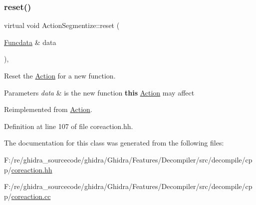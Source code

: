 \subsubsection{\texorpdfstring{reset()}{reset()}}
{\footnotesize\ttfamily virtual void Action\+Segmentize\+::reset (\begin{DoxyParamCaption}\item[{\mbox{\hyperlink{class_funcdata}{Funcdata}} \&}]{data }\end{DoxyParamCaption})\hspace{0.3cm}{\ttfamily [inline]}, {\ttfamily [virtual]}}



Reset the \mbox{\hyperlink{class_action}{Action}} for a new function. 


\begin{DoxyParams}{Parameters}
{\em data} & is the new function {\bfseries{this}} \mbox{\hyperlink{class_action}{Action}} may affect \\
\hline
\end{DoxyParams}


Reimplemented from \mbox{\hyperlink{class_action_ac7c1cf16bb63e0741ba16be5179cf943}{Action}}.



Definition at line 107 of file coreaction.\+hh.



The documentation for this class was generated from the following files\+:\begin{DoxyCompactItemize}
\item 
F\+:/re/ghidra\+\_\+sourcecode/ghidra/\+Ghidra/\+Features/\+Decompiler/src/decompile/cpp/\mbox{\hyperlink{coreaction_8hh}{coreaction.\+hh}}\item 
F\+:/re/ghidra\+\_\+sourcecode/ghidra/\+Ghidra/\+Features/\+Decompiler/src/decompile/cpp/\mbox{\hyperlink{coreaction_8cc}{coreaction.\+cc}}\end{DoxyCompactItemize}
